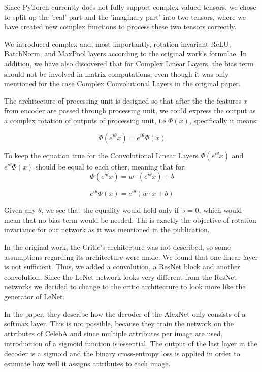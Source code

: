 Since PyTorch currently does not fully support complex-valued tensors, we chose to split up the 'real' part and the 'imaginary part' into two tensors, where we have created new complex functions to process these two tensors correctly.

We introduced complex and, most-importantly, rotation-invariant ReLU, BatchNorm, and MaxPool layers according to the original work's formulae.
In addition, we have also discovered that for Complex Linear Layers, the bias term should not be involved in matrix computations, even though it was only mentioned for the case Complex Convolutional Layers in the original paper. 

The architecture of processing unit is designed so that after the the features $x$ from encoder are passed through processing unit, we could express the output as a complex rotation of outputs of processing unit, i.e $\Phi(x)$, specifically it means:

\begin{equation}
    \Phi(e^{i \theta}x) = e^{i \theta} \Phi (x)
    \label{eq4}
\end{equation}

To keep the equation \label{eq4} true for the Convolutional Linear Layers $\Phi(e^{i \theta} x )$ and $e^{i \theta} \Phi(x)$ should be equal to each other, meaning that for:
\begin{equation}
    \Phi(e^{i \theta}x) = w  \cdot (e^{i \theta}x) + b  
    \label{eq2}
\end{equation}

\begin{equation}
    e^{i \theta} \Phi (x) = e^{i \theta} (w \cdot x + b)
    \label{eq3}
\end{equation}

Given any $\theta$, we see that the equality would hold only if b = 0, which would mean that no bias term would be needed. Thi is exactly the objective of rotation invariance for our network as it was mentioned in the publication.

In the original work, the Critic's architecture was not described, so some assumptions regarding its architecture were made. We found that one linear layer is not sufficient. Thus, we added a convolution, a ResNet block and another convolution.
Since the LeNet network looks very different from the ResNet networks we decided to change to the critic architecture to look more like the generator of LeNet.

In the paper, they describe how the decoder of the AlexNet only consists of a softmax layer. This is not possible, because they train the network on the attributes of CelebA and since multiple attributes per image are used, introduction of a sigmoid function is essential. The output of the last layer in the decoder is a sigmoid and the binary cross-entropy loss is applied in order to estimate how well it assigns attributes to each image.

